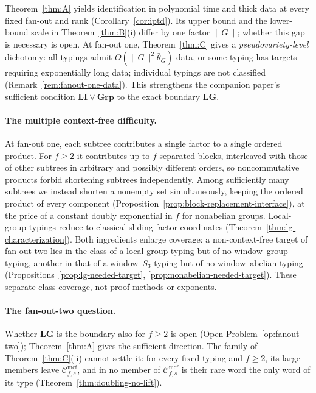\documentclass[11pt]{article}
\numberwithin{equation}{section}
\theoremstyle{plain}
\theoremstyle{definition}
\theoremstyle{remark}
\newcommand{\Cmcf}[2]{\mathcal{C}^{\mathrm{mcf}}_{#1,#2}}
\theoremstyle{plain}
\begin{document}
Theorem~\ref{thm:A} yields identification in polynomial time and thick data
at every fixed fan-out and rank (Corollary~\ref{cor:iptd}).  Its upper bound
and the lower-bound scale in Theorem~\ref{thm:B}(i) differ by one factor
$\|G\|$; whether this gap is necessary is open.  At fan-out one,
Theorem~\ref{thm:C} gives a \emph{pseudovariety-level} dichotomy:
all typings admit $O(\|G\|^2\bar\theta_G)$ data, or some typing has targets
requiring exponentially long data; individual typings are not classified
(Remark~\ref{rem:fanout-one-data}).  This strengthens the companion paper's
sufficient condition $\mathbf{LI}\vee\mathbf{Grp}$ \cite{kuriyamaCFG}
to the exact boundary $\mathbf{LG}$.

\paragraph{The multiple context-free difficulty.}
At fan-out one, each subtree contributes a single factor to a single ordered
product.  For $f\ge2$ it contributes up to $f$ separated blocks, interleaved with those of
other subtrees in arbitrary and possibly different orders, so noncommutative
products forbid shortening subtrees independently.  Among sufficiently many
subtrees we instead shorten a nonempty set simultaneously, keeping the
ordered product of every component
(Proposition~\ref{prop:block-replacement-interface}), at the price of a
constant doubly exponential in $f$ for nonabelian groups.  Local-group typings
reduce to classical sliding-factor coordinates
\cite{Straubing1985,Tilson1987,AlmeidaEtAl2009}
(Theorem~\ref{thm:lg-characterization}).  Both ingredients enlarge coverage: a
non-context-free target of fan-out two lies in the class of a local-group
typing but of no window--group typing, another in that of a window--$S_3$
typing but of no window--abelian typing
(Propositions~\ref{prop:lg-needed-target},
\ref{prop:nonabelian-needed-target}).  These separate class coverage, not
proof methods or exponents.

\paragraph{The fan-out-two question.}
Whether $\mathbf{LG}$ is the boundary also for $f\ge2$ is open (Open
Problem~\ref{op:fanout-two}); Theorem~\ref{thm:A} gives the sufficient
direction.  The family of Theorem~\ref{thm:C}(ii) cannot settle it: for every
fixed typing and $f\ge2$, its large members leave $\Cmcf{f}{s}$, and in no
member of $\Cmcf{f}{s}$ is their rare word the only word of its type
(Theorem~\ref{thm:doubling-no-lift}).
\end{document}
